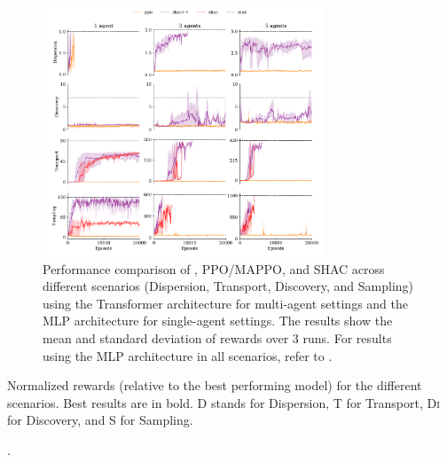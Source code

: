 \begin{figure}[t]
    \centering
    \includegraphics[width=0.75\textwidth]{figs/main-transformer.pdf}
    \caption{Performance comparison of \fname{}, PPO/MAPPO, and SHAC across different scenarios (Dispersion, Transport, Discovery, and Sampling) using the Transformer architecture for multi-agent settings and the MLP architecture for single-agent settings. The results show the mean and standard deviation of rewards over 3 runs. For results using the MLP architecture in all scenarios, refer to .}%
    \label{fig:experiments}
    \vspace{0.2cm}
\end{figure}

\begin{table}[t]
    \centering
    
    \vspace{0.2cm}
    \caption{Normalized rewards (relative to the best performing model) for the different scenarios. Best results are in bold. \textsc{D} stands for Dispersion, \textsc{T} for Transport, \textsc{Di} for Discovery, and \textsc{S} for Sampling.}\label{tab:max-rewards}.
\end{table}


